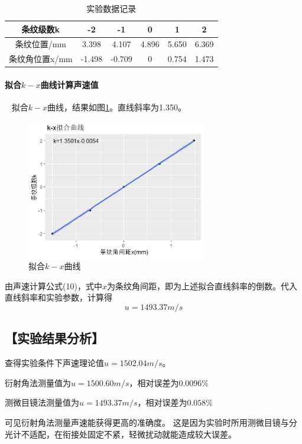 \documentclass[12pt,a4paper,UTF8]{ctexart}
\begin{document}
\begin{table}[htbp]
	\centering
	\caption{实验数据记录}
	\begin{tabular}[width=textwidth]{cccccc}
	\toprule
	条纹级数k    & -2 & -1  & 0 & 1 & 2 \\
	\midrule
	条纹位置/mm    & 3.398 & 4.107 & 4.896 & 5.650 & 6.369 \\
	条纹角位置x/mm   & -1.498 & -0.709 & 0 & 0.754 & 1.473 \\
	\bottomrule
	\end{tabular}
	\label{tab:2}
\end{table}

\paragraph{拟合$k-x$曲线计算声速值}~
		\newline
		\indent
		拟合$k-x$曲线，结果如图\ref{fig:2}。直线斜率为1.350。
		\begin{figure}[htbp]
			\centering
			\includegraphics[width=0.7\textwidth]{img/curve2.jpeg}
			\caption{拟合$k-x$曲线}
			\label{fig:2}
		\end{figure}
		
		由声速计算公式(10)，式中$x$为条纹角间距，即为上述拟合直线斜率的倒数。代入直线斜率和实验参数，计算得
		$$
		u = 1493.37 m/s
		$$

\subsection*{【实验结果分析】}
查得实验条件下声速理论值$u = 1502.04 m/s$。

衍射角法测量值为$u = 1500.60 m/s$，相对误差为$0.0096\%$

测微目镜法测量值为$u = 1493.37 m/s$，相对误差为$0.058\%$

可见衍射角法测量声速能获得更高的准确度。
这是因为实验时所用测微目镜与分光计不适配，在衔接处固定不紧，轻微扰动就能造成较大误差。
\end{document}
